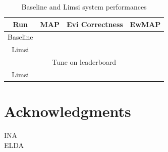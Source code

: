 \documentclass{acm_proc_article-me}
\begin{document}
\begin{table}[ht]
  \centering
  \begin{tabular}{|c||c|c|c|}
    \hline
    Run      					& MAP 		& Evi Correctness 	& EwMAP     \\
    \hline
    \hline    
    Baseline						&		   	&		   			&			\\
    Limsi 						&		   	&		   			&			\\ 
    \hline    
    \hline    
    \multicolumn{4}{|c|}{Tune on leaderboard} 								\\
    \hline    
    \hline    
    	Limsi						&		   	&		   			&			\\
    \hline    
   \end{tabular}
  \caption{Baseline and Limsi system performances}
  \label{tab:perfs}
\end{table}



\section{Acknowledgments}

INA \\
ELDA \\



\end{document}
